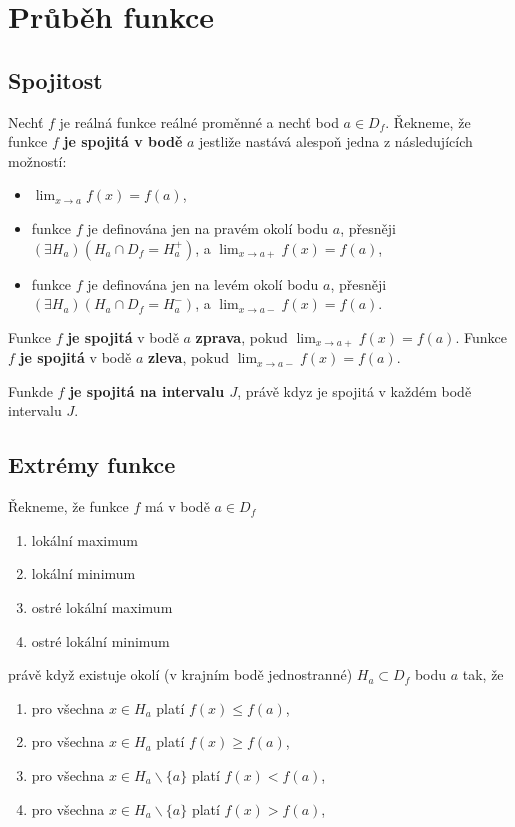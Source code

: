 \documentclass{szzclass}
\begin{document}
\newpage

\section{Průběh funkce}

\subsection{Spojitost}

Nechť $f$ je reálná funkce reálné proměnné a nechť bod
$a \in D_f$. Řekneme, že funkce $f$ \textbf{je spojitá v bodě}
$a$ jestliže nastává alespoň jedna z následujících možností:

\begin{itemize}
    \item $\displaystyle \lim_{x\to a} f(x) = f(a)$,
    \item funkce $f$ je definována jen na pravém okolí bodu $a$, přesněji $(\exists H_a)(H_a \cap D_f = H^+_a)$, a $\displaystyle \lim_{x\to a+} f(x) = f(a)$,
    \item funkce $f$ je definována jen na levém okolí bodu $a$, přesněji $(\exists H_a)(H_a \cap D_f = H^-_a)$, a $\displaystyle \lim_{x\to a-} f(x) = f(a)$.
\end{itemize}

Funkce $f$ \textbf{je spojitá} v bodě $a$ \textbf{zprava}, pokud $\displaystyle\lim_{x\to a+} f(x) = f(a)$.\newline
Funkce $f$ \textbf{je spojitá} v bodě $a$ \textbf{zleva}, pokud $\displaystyle\lim_{x\to a-} f(x) = f(a)$.

Funkde $f$ \textbf{je spojitá na intervalu $J$}, právě kdyz je spojitá v každém bodě intervalu \textbf{$J$}.

\subsection{Extrémy funkce}

Řekneme, že funkce $f$ má v bodě $a \in D_f$
\begin{enumerate}
    \item lokální maximum
    \item lokální minimum
    \item ostré lokální maximum
    \item ostré lokální minimum
\end{enumerate}
právě když existuje okolí (v krajním bodě jednostranné) $H_a \subset D_f$ bodu $a$ tak, že
\begin{enumerate}
    \item pro všechna $x \in H_a$ platí $f(x) \leq f(a)$,
    \item pro všechna $x \in H_a$ platí $f(x) \geq f(a)$,
    \item pro všechna $x \in H_a \backslash \{a\}$ platí $f(x) < f(a)$,
    \item pro všechna $x \in H_a \backslash \{a\}$ platí $f(x) > f(a)$,
\end{enumerate}
\end{document}

